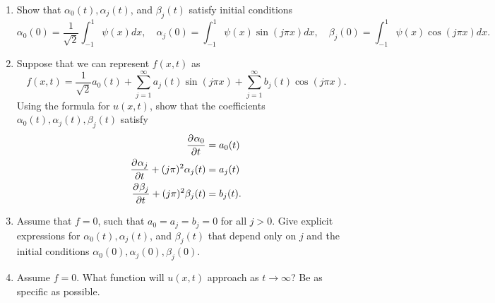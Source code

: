 \begin{enumerate}
\item Show that $\alpha_0(t), \alpha_j(t)$, and $\beta_j(t)$ satisfy initial conditions 
\[
\alpha_0(0) = \frac{1}{\sqrt{2}} \int_{-1}^1\psi(x) dx, \quad \alpha_j(0) = \int_{-1}^1\psi(x) \sin(j\pi x) dx, \quad \beta_j(0) = \int_{-1}^1\psi(x)\cos(j\pi x) dx.
\]
\vspace{2em}
\item Suppose that we can represent $f(x,t)$ as
\[
f(x,t) = \frac{1}{\sqrt{2}} a_0(t) + \sum_{j=1}^\infty a_j(t)\sin(j\pi x) + \sum_{j=1}^\infty b_j(t)\cos(j\pi x).
\]
Using the formula for $u(x,t)$, show that the coefficients $\alpha_0(t), \alpha_j(t), \beta_j(t)$ satisfy
\begin{align*}
\frac{\partial^{} \alpha_0}{\partial t^{}} &= a_0(t)\\
\frac{\partial^{} \alpha_j}{\partial t^{}} + (j\pi)^2\alpha_j(t) &= a_j(t)\\
\frac{\partial^{} \beta_j}{\partial t^{}} + (j\pi)^2\beta_j(t)  &= b_j(t).
\end{align*}
\item Assume that $f=0$, such that $a_0 = a_j = b_j = 0$ for all $j > 0$.  Give explicit expressions for $\alpha_0(t), \alpha_j(t)$, and $\beta_j(t)$ that depend only on $j$ and the initial conditions $\alpha_0(0), \alpha_j(0), \beta_j(0)$.    

\vspace{2em}
\item Assume $f = 0$.  What function will $u(x,t)$ approach as $t\rightarrow \infty$?  Be as specific as possible.
\end{enumerate}



